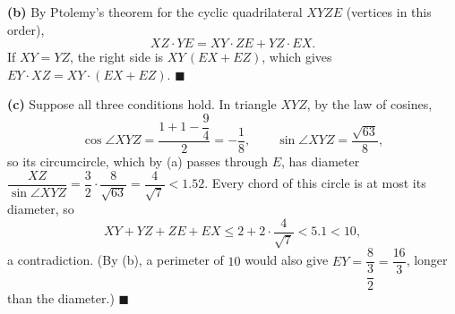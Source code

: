 \textbf{(b)} By Ptolemy's theorem for the cyclic quadrilateral $XYZE$ (vertices in this order),
\[
XZ\cdot YE=XY\cdot ZE+YZ\cdot EX .
\]
If $XY=YZ$, the right side is $XY\,(EX+EZ)$, which gives $EY\cdot XZ=XY\cdot(EX+EZ)$. $\blacksquare$

\textbf{(c)} Suppose all three conditions hold. In triangle $XYZ$, by the law of cosines,
\[
\cos\angle XYZ=\dfrac{1+1-\dfrac{9}{4}}{2}=-\dfrac{1}{8},\qquad\sin\angle XYZ=\dfrac{\sqrt{63}}{8} ,
\]
so its circumcircle, which by (a) passes through $E$, has diameter $\dfrac{XZ}{\sin\angle XYZ}=\dfrac{3}{2}\cdot\dfrac{8}{\sqrt{63}}=\dfrac{4}{\sqrt7}<1.52$. Every chord of this circle is at most its diameter, so
\[
XY+YZ+ZE+EX\le2+2\cdot\dfrac{4}{\sqrt7}<5.1<10 ,
\]
a contradiction. (By (b), a perimeter of $10$ would also give $EY=\dfrac{8}{\dfrac{3}{2}}=\dfrac{16}{3}$, longer than the diameter.) $\blacksquare$

